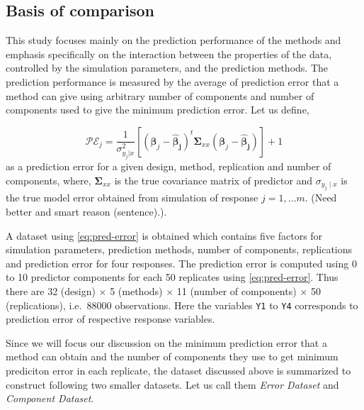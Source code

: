 \documentclass[12pt,3p,authoryear]{elsarticle}
\begin{document}
\hypertarget{basis-of-comparison}{%
\subsection{Basis of comparison}\label{basis-of-comparison}}

This study focuses mainly on the prediction performance of the methods
and emphasis specifically on the interaction between the properties of
the data, controlled by the simulation parameters, and the prediction
methods. The prediction performance is measured by the average of
prediction error that a method can give using arbitrary number of
components and number of components used to give the minimum prediction
error. Let us define,

\begin{equation}
\mathcal{PE}_j = \frac{1}{\sigma_{y_j|x}^2}\left[\left(\boldsymbol{\beta}_j - \boldsymbol{\hat{\beta}_j}\right)^t\boldsymbol{\Sigma}_{xx}\left(\boldsymbol{\beta}_j - \boldsymbol{\hat{\beta}_j}\right)\right] + 1
\label{eq:pred-error}
\end{equation} as a prediction error for a given design, method,
replication and number of components, where,
\(\boldsymbol{\Sigma}_{xx}\) is the true covariance matrix of predictor
and \(\sigma_{y_j\mid x}\) is the true model error obtained from
simulation of response \(j = 1, \ldots m\).
(\alert{Need better and smart reason (sentence).}).

A dataset using \eqref{eq:pred-error} is obtained which contains five
factors for simulation parameters, prediction methods, number of
components, replications and prediction error for four responses. The
prediction error is computed using 0 to 10 predictor components for each
50 replicates using \eqref{eq:pred-error}. Thus there are 32 (design)
\(\times\) 5 (methods) \(\times\) 11 (number of components) \(\times\)
50 (replications), i.e.~88000 observations. Here the variables
\texttt{Y1} to \texttt{Y4} corresponds to prediction error of respective
response variables.

Since we will focus our discussion on the minimum prediction error that
a method can obtain and the number of components they use to get minimum
prediciton error in each replicate, the dataset discussed above is
summarized to construct following two smaller datasets. Let us call them
\emph{Error Dataset} and \emph{Component Dataset}.
\end{document}

